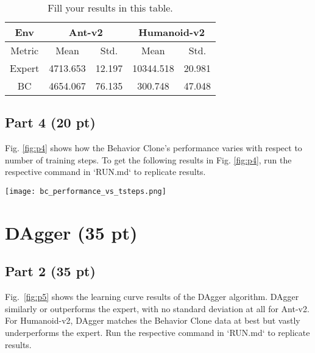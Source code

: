 \documentclass{article}
\newcommand{\fref}[1]{Fig.~\ref{#1}}
\begin{document}
\begin{table}[htbp]
  \centering
  \caption{Fill your results in this table.}
    \begin{tabular}{ccccc}
    \toprule[1.0pt]
    Env   & \multicolumn{2}{c}{Ant-v2} & \multicolumn{2}{c}{Humanoid-v2} \\
    \midrule
    Metric & Mean  & Std.  & Mean  & Std. \\
    Expert & 4713.653 & 12.197 & 10344.518 & 20.981 \\
    BC    & 4654.067 & 76.135 & 300.748 & 47.048 \\
    \bottomrule[1.0pt]
    \end{tabular}%
  \label{tab:p3}%
\end{table}%

\subsection{Part 4 (20 pt)}
Fig. \ref{fig:p4} shows how the Behavior Clone's performance varies with respect to number of training steps. To get the following results in Fig. \ref{fig:p4}, run the respective command in `RUN.md` to replicate results.

\begin{figure*}[!h]
	\centering
\texttt{[image: bc\_performance\_vs\_tsteps.png]}
	\caption{BC agent’s performance (mean and standard deviation) varies with the value of the training steps parameter in Ant v2 environment. I chose this parameter because I know in any learning context, the number of training steps or epochs a model has to learn from the data and descend in loss, the better it becomes, until performance plateaus or saturates.}
	\label{fig:p4}
\end{figure*}

\clearpage
\section{DAgger (35 pt)}
\subsection{Part 2 (35 pt)}
\fref{fig:p5} shows the learning curve results of the DAgger algorithm. DAgger similarly or outperforms the expert, with no standard deviation at all for Ant-v2. For Humanoid-v2, DAgger matches the Behavior Clone data at best but vastly underperforms the expert.  Run the respective command in `RUN.md` to replicate results.
\end{document}
